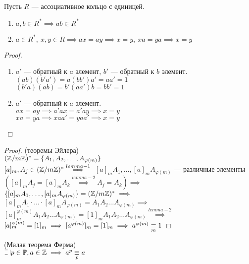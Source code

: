 \begin{normalsize}
\begin{lemma}
    Пусть $R$ --- ассоциативное кольцо с единицей.
    \begin{enumerate}
        \item $a, b \in R^* \implies ab \in R^*$
        \item $a \in R^*,~x,y \in R \implies ax = ay \implies x = y,~xa = ya \implies x = y$
    \end{enumerate}
\end{lemma}

\begin{proof}
    \begin{enumerate}
        \item $a'$ --- обратный к $a$ элемент, $b'$ --- обратный к $b$ элемент.\\
        $(ab)(b'a') = a(bb')a' = aa' = 1$\\
        $(b'a)(ab) = b'(aa')b = bb' = 1$
        \item $a'$ --- обратный к $a$ элемент.\\
        $ax = ay \implies a'ax = a'ay \implies x = y$\\
        $xa = ya \implies xaa' = yaa' \implies x = y$
    \end{enumerate}
\end{proof}

\begin{proof}(теоремы Эйлера)\\
    $(\mathbb{Z}/m\mathbb{Z})^* = \{A_1, A_2, \ldots, A_{\varphi(m)}\}$\\
    $[a]_m, A_j \in (\mathbb{Z}/m\mathbb{Z})^* \overset{lemma-1}{\implies}\\$
    $[a]_m A_1, \ldots, [a]_m A_{\varphi(m)}$ --- различные элементы \\
    $([a]_m A_j = [a]_m A_k \overset{lemma-2}{\implies} A_j = A_k) \implies$\\
    $\{[a]_m A_1, \ldots, [a]_m A_{\varphi(m)}\} = (\mathbb{Z}/m\mathbb{Z})^* \implies$\\
    $[a]_m A_1 \cdot \ldots \cdot [a]_m A_{\varphi(m)} = A_1 A_2 \ldots A_{\varphi(m)} \implies$\\
    $[a]_m^{\varphi(m)} A_1 A_2 \ldots A_{\varphi(m)} = [1]_m A_1 A_2 \ldots A_{\varphi(m)} \overset{lemma-2}{\implies}$\\
    $[a]_m^{\varphi(m)} = [1]_m \implies [a^{\varphi(m)}]_m = [1]_m \implies a^{\varphi(m)} \underset{m}{\equiv} 1$
\end{proof}

\begin{theorem}(Малая теорема Ферма)\\
    $\letus p \in \mathP, a \in \mathZ \implies a^p \equivm{p} a$
\end{theorem}


\end{normalsize}
